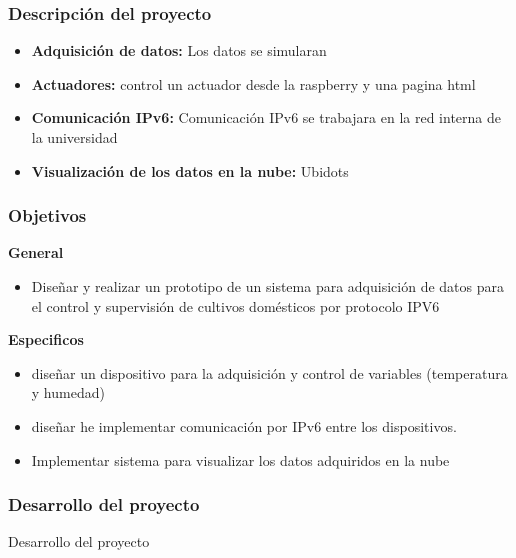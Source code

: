 \documentclass[10pt]{beamer}\usepackage[]{graphicx}\usepackage[]{color}
\begin{document}
\begin{frame}
\frametitle{Descripción del proyecto}
	\begin{itemize}
		\item \textbf{Adquisición de datos:} Los datos se simularan 
		\item \textbf{Actuadores:} control un actuador desde la raspberry y una pagina html		
		\item \textbf{Comunicación IPv6:} Comunicación IPv6 se trabajara en la red interna de la universidad 
		\item\textbf{ Visualización de los datos en la nube:} Ubidots 
			
	\end{itemize}
\end{frame}

\begin{frame}
\frametitle{Objetivos}
\textbf{General}
	\begin{itemize}
		\item Diseñar y realizar un prototipo de un sistema para adquisición de datos para el control y supervisión de cultivos domésticos por protocolo IPV6
	\end{itemize}
	
\textbf{Especificos}
	\begin{itemize}
		\item diseñar un dispositivo para la adquisición y control de variables (temperatura y humedad)
		\item diseñar he implementar comunicación por IPv6 entre los dispositivos.
		\item Implementar sistema para visualizar los datos adquiridos en la nube 
	\end{itemize}
\end{frame}

\begin{frame}
\frametitle{Desarrollo del proyecto}

{\Huge Desarrollo del proyecto}

\end{frame}
\end{document}

